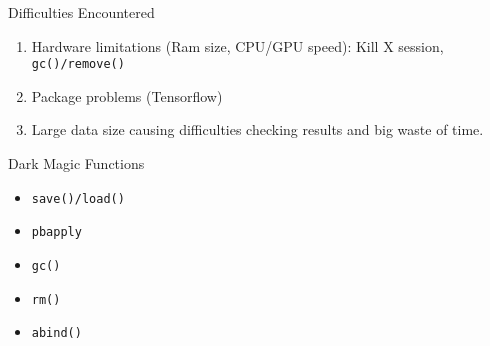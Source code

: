\documentclass{beamer}
\begin{document}
\begin{frame}{Difficulties Encountered}
	\begin{enumerate}
		\item Hardware limitations (Ram size, CPU/GPU speed): Kill X session, \texttt{gc()/remove()}
		\item Package problems (Tensorflow)
		\item Large data size causing difficulties checking results and big waste of time.
		

	\end{enumerate}
\end{frame}

\begin{frame}{Dark Magic Functions}
	\begin{itemize}
		\item \texttt{save()/load()}
		\item \texttt{pbapply}
		\item \texttt{gc()}
		\item \texttt{rm()}
		\item \texttt{abind()}

	\end{itemize}
	
\end{frame}
\end{document}
